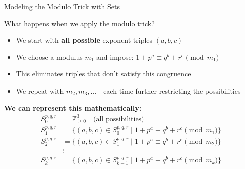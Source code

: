 \begin{frame}{Modeling the Modulo Trick with Sets}
    \begin{block}{What happens when we apply the modulo trick?}
        \begin{itemize}
            \item We start with \textbf{all possible} exponent triples $(a,b,c)$
            \item We choose a modulus $m_1$ and impose: $1+p^a \equiv q^b+r^c \pmod{m_1}$
            \item This eliminates triples that don't satisfy this congruence
            \item We repeat with $m_2, m_3, ...$ - each time further restricting the possibilities
        \end{itemize}
    \end{block}

    \vspace{0.3cm}
    \textbf{We can represent this mathematically:}
    \begin{align*}
        S_0^{p,q,r} &= \mathbb{Z}_{\geq 0}^3 \quad \text{(all possibilities)} \\
        S_1^{p,q,r} &= \{(a,b,c) \in S_0^{p,q,r} \; | \; 1+p^a \equiv q^b+r^c \pmod{m_1}\} \\
        S_2^{p,q,r} &= \{(a,b,c) \in S_1^{p,q,r} \; | \; 1+p^a \equiv q^b+r^c \pmod{m_2}\} \\
        &\vdots \\
        S_k^{p,q,r} &= \{(a,b,c) \in S_{k-1}^{p,q,r} \; | \; 1+p^a \equiv q^b+r^c \pmod{m_k}\}
    \end{align*}
\end{frame}

